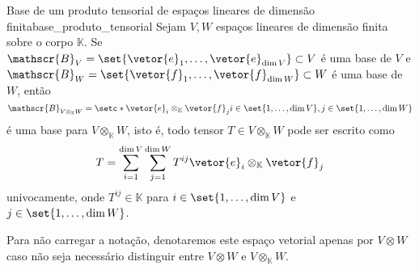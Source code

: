 \begin{lemma}{Base de um produto tensorial de espaços lineares de dimensão finita}{base_produto_tensorial}
    Sejam \(V, W\) espaços lineares de dimensão finita sobre o corpo \(\mathbb{K}\). Se \(\mathscr{B}_V = \set{\vetor{e}_1, \dots, \vetor{e}_{\dim V}} \subset V\) é uma base de \(V\) e \(\mathscr{B}_W = \set{\vetor{f}_1, \dots, \vetor{f}_{\dim W}} \subset W\) é uma base de \(W\), então
    \begin{equation*}
        \mathscr{B}_{V \otimes_{\mathbb{K}} W} = \setc*{\vetor{e}_i \otimes_{\mathbb{K}} \vetor{f}_j}{i \in \set{1, \dots, \dim V}, j \in \set{1, \dots, \dim W}}
    \end{equation*}
    é uma base para \(V \otimes_{\mathbb{K}} W\), isto é, todo tensor \(T \in V \otimes_{\mathbb{K}} W\) pode ser escrito como
    \begin{equation*}
        T = \sum_{i = 1}^{\dim V} \sum_{j = 1}^{\dim W} T^{ij} \vetor{e}_i\otimes_{\mathbb{K}}\vetor{f}_j
    \end{equation*}
    univocamente, onde \(T^{ij} \in \mathbb{K}\) para \(i \in \set{1, \dots, \dim V}\) e \(j \in \set{1, \dots, \dim W}\).
\end{lemma}
\begin{remark}
    Para não carregar a notação, denotaremos este espaço vetorial apenas por \(V \otimes W\) caso não seja necessário distinguir entre \(V \otimes W\) e \(V \otimes_{\mathbb{K}} W\).
\end{remark}
